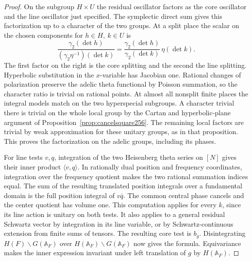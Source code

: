 \documentclass[a4paper,11pt]{article}
\theoremstyle{definition}
\theoremstyle{remark}
\numberwithin{equation}{section}
\begin{document}
\begin{proof}
On the subgroup \(H\times U\) the residual oscillator factors
as the core oscillator and the line oscillator just specified.
The symplectic direct sum gives this factorization up to a
character of the two groups. At a split place the scalar on the
chosen components for \(h\in H,\ k\in U\) is
\[
  \frac{\gamma_2(\det h)}
       {(\gamma_2\eta^{-1})(\det k)}
  =\frac{\gamma_2(\det h)}{\gamma_2(\det k)}\,\eta(\det k).
\]
The first factor on the right is the core splitting and the
second the line splitting. Hyperbolic substitution in the
\(x\)-variable has Jacobian one. Rational changes of polarization
preserve the adelic theta functional by Poisson summation, so
the character ratio is trivial on rational points. At almost
all nonsplit finite places the integral models match on the
two hyperspecial subgroups. A character trivial there is trivial
on the whole local group by the Cartan and hyperbolic-plane
argument of Proposition~\ref{prop:cancelsquare256}. The
remaining local factors are trivial by weak approximation for
these unitary groups, as in that proposition. This proves the
factorization on the adelic groups, including its phases.

For line tests \(v,q\), integration of the two Heisenberg theta
series on \([N]\) gives their inner product \(\langle v,q\rangle\).
In rationally dual position and frequency coordinates, integration
over the frequency quotient makes the two rational summation
indices equal. The sum of the resulting translated position
integrals over a fundamental domain is the full position integral
of \(v\bar q\). The common central phase cancels and the center
quotient has volume one. This computation applies for every
\(k\), since its line action is unitary on both tests. It also
applies to a general residual Schwartz vector by integration
in its line variable, or by Schwartz-continuous extension from
finite sums of tensors. The resulting core test is \(b_g\).
Disintegrating \(H(F)\backslash G(\mathbb A_F)\) over
\(H(\mathbb A_F)\backslash G(\mathbb A_F)\) now gives the
formula. Equivariance makes the inner expression invariant
under left translation of \(g\) by \(H(\mathbb A_F)\).


\end{proof}
\end{document}
